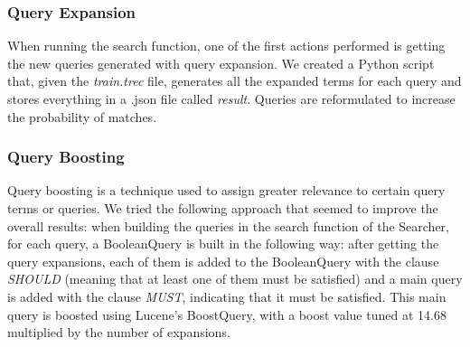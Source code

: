 \subsubsection{Query Expansion}
When running the search function, one of the first actions performed is getting the new queries generated with query expansion.
We created a Python script that, given the \textit{train.trec} file, generates all the expanded terms for each query and stores everything in a .json file called \textit{result}.
\newline
Queries are reformulated to increase the probability of matches.


\subsubsection{Query Boosting}
Query boosting is a technique used to assign greater relevance to certain query terms or queries.\newline
We tried the following approach that seemed to improve the overall results: when building the queries in the search function of the Searcher, for each query, a BooleanQuery is built in the following way: after getting the query expansions, each of them is added to the BooleanQuery with the clause \textit{SHOULD} (meaning that at least one of them must be satisfied) and a main query is added with the clause \textit{MUST}, indicating that it must be satisfied. This main query is boosted using Lucene's BoostQuery, with a boost value tuned at 14.68 multiplied by the number of expansions.